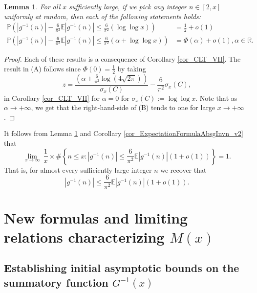 \documentclass[11pt,reqno,a4letter]{article}
\numberwithin{figure}{section}
\numberwithin{table}{section}
\theoremstyle{plain}
\newtheorem{lemma}[theorem]{Lemma}
\numberwithin{theorem}{section}
\theoremstyle{definition}
\begin{document}
\begin{lemma} 
\label{lemma_ProbsOfAbsgInvnDist_v2} 
For all $x$ sufficiently large, if we pick any integer $n \in [2, x]$ uniformly at random, then 
each of the following statements holds: 
\begin{align*} 
\tag{A}
     \mathbb{P}\left(|g^{-1}(n)| - \frac{6}{\pi^2} \mathbb{E}|g^{-1}(n)| \leq 
     \frac{6}{\pi^2} (\log\log x) 
     \right) & = \frac{1}{2} + o(1) \\ 
\tag{B} 
\mathbb{P}\left(|g^{-1}(n)| - \frac{6}{\pi^2} \mathbb{E}|g^{-1}(n)| \leq 
     \frac{6}{\pi^2}\left(\alpha + \log\log x\right)
     \right) & = 
     \Phi\left(\alpha\right) + o(1), \alpha \in \mathbb{R}. 
\end{align*} 
\end{lemma} 
\begin{proof} 
Each of these results is a consequence of Corollary \ref{cor_CLT_VII}. 
The result in (A) follows since $\Phi(0) = \frac{1}{2}$ by taking 
$$z = \frac{\left(\alpha + \frac{6}{\pi^2} \log\left(4\sqrt{2\pi}\right)\right)}{\sigma_x(C)} - 
  \frac{6}{\pi^2} \sigma_x(C),$$ 
in Corollary \ref{cor_CLT_VII} 
for $\alpha = 0$ for $\sigma_x(C) := \log\log x$. Note that as $\alpha \rightarrow +\infty$, 
we get that the right-hand-side of (B) tends to one for large $x \rightarrow +\infty$. 
\end{proof} 

\label{remark_ProbsOfAbsgInvnDist_v3} 
It follows from Lemma \ref{lemma_ProbsOfAbsgInvnDist_v2} and 
Corollary \ref{cor_ExpectationFormulaAbsgInvn_v2} that 
\[
\lim_{x \rightarrow \infty}\ \frac{1}{x} \times \#\left\{n \leq x: 
     |g^{-1}(n)| \leq \frac{6}{\pi^2} \mathbb{E}|g^{-1}(n)| (1+o(1))\right\} = 1. 
\]
That is, for almost every sufficiently large integer $n$ we recover that 
$$|g^{-1}(n)| \leq \frac{6}{\pi^2} \mathbb{E}|g^{-1}(n)| (1+o(1)).$$

\newpage 
\section{New formulas and limiting relations characterizing $M(x)$} 
\label{Section_KeyApplications} 

\subsection{Establishing initial asymptotic bounds on the summatory function $G^{-1}(x)$} 
\label{Section_ProofOfValidityOfAverageOrderLowerBounds} 
\end{document}
